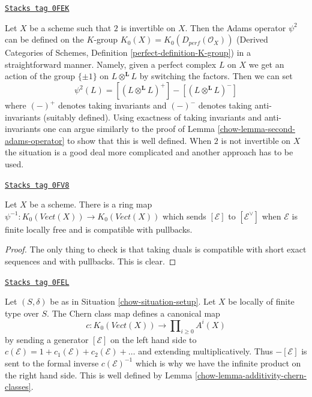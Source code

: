 \begin{remark}
\label{chow-remark-adams-derived}
\href{https://stacks.math.columbia.edu/tag/0FEK}{\texttt{Stacks tag 0FEK}}

Let $X$ be a scheme such that $2$ is invertible on $X$.
Then the Adams operator $\psi^2$ can be defined on the $K$-group
$K_0(X) = K_0(D_{perf}(\mathcal{O}_X))$
(Derived Categories of Schemes, Definition \ref{perfect-definition-K-group})
in a straightforward manner.
Namely, given a perfect complex $L$ on $X$ we get an action
of the group $\{\pm 1\}$ on $L \otimes^\mathbf{L} L$ by switching
the factors. Then we can set
$$
\psi^2(L) = [(L \otimes^\mathbf{L} L)^+] -
[(L \otimes^\mathbf{L} L)^-]
$$
where $(-)^+$ denotes taking invariants and $(-)^-$ denotes taking
anti-invariants (suitably defined).
Using exactness of taking invariants and anti-invariants one can
argue similarly to the proof of Lemma \ref{chow-lemma-second-adams-operator}
to show that this is well defined.
When $2$ is not invertible on $X$ the situation is a good deal more
complicated and another approach has to be used.
\end{remark}

\begin{lemma}
\label{chow-lemma-minus-adams-operator}
\href{https://stacks.math.columbia.edu/tag/0FV8}{\texttt{Stacks tag 0FV8}}

Let $X$ be a scheme. There is a ring map
$\psi^{-1} : K_0(\textit{Vect}(X)) \to K_0(\textit{Vect}(X))$
which sends $[\mathcal{E}]$ to $[\mathcal{E}^\vee]$
when $\mathcal{E}$ is finite locally free
and is compatible with pullbacks.
\end{lemma}

\begin{proof}
The only thing to check is that taking duals is compatible with
short exact sequences and with pullbacks. This is clear.
\end{proof}

\begin{remark}
\label{chow-remark-chern-classes-K}
\href{https://stacks.math.columbia.edu/tag/0FEL}{\texttt{Stacks tag 0FEL}}

Let $(S, \delta)$ be as in Situation \ref{chow-situation-setup}.
Let $X$ be locally of finite type over $S$. The Chern class
map defines a canonical map
$$
c : K_0(\textit{Vect}(X)) \longrightarrow \prod\nolimits_{i \geq 0} A^i(X)
$$
by sending a generator $[\mathcal{E}]$ on the left hand side to
$c(\mathcal{E}) = 1 + c_1(\mathcal{E}) + c_2(\mathcal{E}) + \ldots$
and extending multiplicatively. Thus $-[\mathcal{E}]$ is sent to
the formal inverse $c(\mathcal{E})^{-1}$ which is why we have the
infinite product on the right hand side. This is well defined by
Lemma \ref{chow-lemma-additivity-chern-classes}.
\end{remark}

